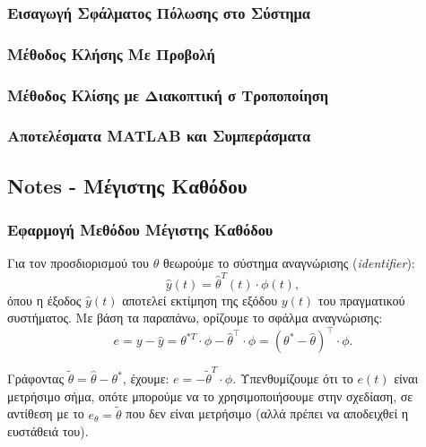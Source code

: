 \documentclass[12pt]{article} %
\numberwithin{equation}{section}  %
\begin{document}
\subsubsection{Εισαγωγή Σφάλματος Πόλωσης στο Σύστημα}

\subsubsection{Μέθοδος Κλήσης Με Προβολή}

\subsubsection{Μέθοδος Κλίσης με Διακοπτική σ Τροποποίηση}

\subsubsection{Αποτελέσματα MATLAB και Συμπεράσματα}

\newpage


\subsection{Notes - Μέγιστης Καθόδου}

\subsubsection{Εφαρμογή Μεθόδου Μέγιστης Καθόδου}

\noindent\textbullet\hspace{0.2em} Για τον προσδιορισμού του $\hat{\theta}$ θεωρούμε το σύστημα αναγνώρισης (\textit{identifier}):
\vspace{-\topsep}
\vspace{+3pt}
\[
\hat{y}(t) = \hat{\theta}^Τ(t) \cdot \phi(t),
\]
όπου η έξοδος $\hat{y}(t)$ αποτελεί εκτίμηση της εξόδου $y(t)$ του πραγματικού συστήματος. Με βάση τα παραπάνω, ορίζουμε το σφάλμα αναγνώρισης:
\vspace{-\topsep}
\vspace{+3pt}
\[
e = y - \hat{y} = \theta^{*T} \cdot \phi - \hat{\theta}^{\top} \cdot \phi = \left( \theta^* - \hat{\theta} \right)^{\top} \cdot \phi.
\]

\vspace{-10pt}

\noindent Γράφοντας $\tilde{\theta} = \hat{\theta} - \theta^*$, έχουμε: $e = -\tilde{\theta}^Τ \cdot \phi$. Υπενθυμίζουμε ότι το $e(t)$ είναι μετρήσιμο σήμα, οπότε μπορούμε να το χρησιμοποιήσουμε στην σχεδίαση, σε αντίθεση με το $e_\theta = \tilde{\theta}$ που δεν είναι μετρήσιμο (αλλά πρέπει να αποδειχθεί η ευστάθειά του). 
\end{document}
